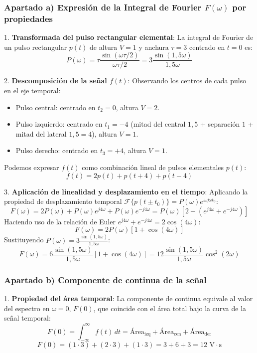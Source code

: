 \begin{resolucion}
\subsubsection*{Apartado a) Expresión de la Integral de Fourier $F(\omega)$ por propiedades}

1. \textbf{Transformada del pulso rectangular elemental}:
   La integral de Fourier de un pulso rectangular $p(t)$ de altura $V=1$ y anchura $\tau = 3$ centrado en $t=0$ es:
   \[
   P(\omega) = \tau \frac{\sin(\omega \tau / 2)}{\omega \tau / 2} = 3 \frac{\sin(1{,}5 \omega)}{1{,}5 \omega}
   \]

2. \textbf{Descomposición de la señal $f(t)$}:
   Observando los centros de cada pulso en el eje temporal:
   \begin{itemize}
       \item Pulso central: centrado en $t_2 = 0$, altura $V = 2$.
       \item Pulso izquierdo: centrado en $t_1 = -4$ (mitad del central $1{,}5$ + separación $1$ + mitad del lateral $1{,}5 = 4$), altura $V = 1$.
       \item Pulso derecho: centrado en $t_3 = +4$, altura $V = 1$.
   \end{itemize}
   Podemos expresar $f(t)$ como combinación lineal de pulsos elementales $p(t)$:
   \[
   f(t) = 2 p(t) + p(t+4) + p(t-4)
   \]

3. \textbf{Aplicación de linealidad y desplazamiento en el tiempo}:
   Aplicando la propiedad de desplazamiento temporal $\mathcal{F}\{p(t \pm t_0)\} = P(\omega) e^{\pm j \omega t_0}$:
   \[
   F(\omega) = 2 P(\omega) + P(\omega) e^{j 4 \omega} + P(\omega) e^{-j 4 \omega} = P(\omega) \left[ 2 + \left( e^{j 4 \omega} + e^{-j 4 \omega} \right) \right]
   \]
   Haciendo uso de la relación de Euler $e^{j 4 \omega} + e^{-j 4 \omega} = 2 \cos(4\omega)$:
   \[
   F(\omega) = 2 P(\omega) \left[ 1 + \cos(4\omega) \right]
   \]
   Sustituyendo $P(\omega) = 3 \frac{\sin(1{,}5\omega)}{1{,}5\omega}$:
   \[
   F(\omega) = 6 \frac{\sin(1{,}5\omega)}{1{,}5\omega} \left[ 1 + \cos(4\omega) \right] = 12 \frac{\sin(1{,}5\omega)}{1{,}5\omega} \cos^2(2\omega)
   \]

\subsubsection*{Apartado b) Componente de continua de la señal}

1. \textbf{Propiedad del área temporal}:
   La componente de continua equivale al valor del espectro en $\omega = 0$, $F(0)$, que coincide con el área total bajo la curva de la señal temporal:
   \[
   F(0) = \int_{-\infty}^{\infty} f(t) \, dt = \text{Área}_{\text{izq}} + \text{Área}_{\text{cen}} + \text{Área}_{\text{der}}
   \]
   \[
   F(0) = (1 \cdot 3) + (2 \cdot 3) + (1 \cdot 3) = 3 + 6 + 3 = 12 \text{ V}\cdot\text{s}
   \]


\end{resolucion}
